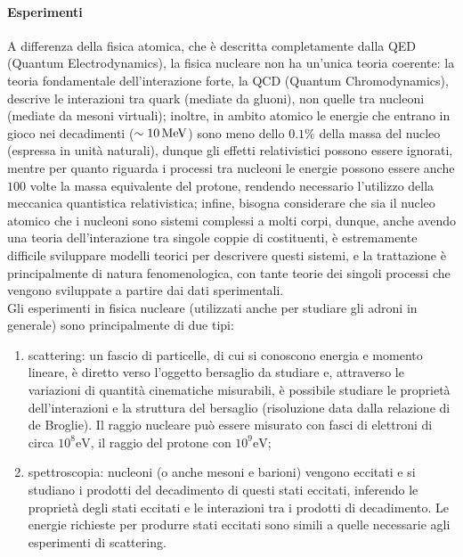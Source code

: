 \paragraph{Esperimenti}

A differenza della fisica atomica, che è descritta completamente dalla QED (Quantum Electrodynamics), la fisica nucleare non ha un'unica teoria coerente: la teoria fondamentale dell'interazione forte, la QCD (Quantum Chromodynamics), descrive le interazioni tra quark (mediate da gluoni), non quelle tra nucleoni (mediate da mesoni virtuali); inoltre, in ambito atomico le energie che entrano in gioco nei decadimenti ($ \sim 10\,\mathrm{MeV} $) sono meno dello $ 0.1\% $ della massa del nucleo (espressa in unità naturali), dunque gli effetti relativistici possono essere ignorati, mentre per quanto riguarda i processi tra nucleoni le energie possono essere anche $ 100 $ volte la massa equivalente del protone, rendendo necessario l'utilizzo della meccanica quantistica relativistica; infine, bisogna considerare che sia il nucleo atomico che i nucleoni sono sistemi complessi a molti corpi, dunque, anche avendo una teoria dell'interazione tra singole coppie di costituenti, è estremamente difficile sviluppare modelli teorici per descrivere questi sistemi, e la trattazione è principalmente di natura fenomenologica, con tante teorie dei singoli processi che vengono sviluppate a partire dai dati sperimentali.\\
Gli esperimenti in fisica nucleare (utilizzati anche per studiare gli adroni in generale) sono principalmente di due tipi:
\begin{enumerate}
  \item scattering: un fascio di particelle, di cui si conoscono energia e momento lineare, è diretto verso l'oggetto bersaglio da studiare e, attraverso le variazioni di quantità cinematiche misurabili, è possibile studiare le proprietà dell'interazioni e la struttura del bersaglio (risoluzione data dalla relazione di de Broglie). Il raggio nucleare può essere misurato con fasci di elettroni di circa $10^8 \text{eV}$, il raggio del protone con $10^9 \text{eV}$;
  \item spettroscopia: nucleoni (o anche mesoni e barioni) vengono eccitati e si studiano i prodotti del decadimento di questi stati eccitati, inferendo le proprietà degli stati eccitati e le interazioni tra i prodotti di decadimento. Le energie richieste per produrre stati eccitati sono simili a quelle necessarie agli esperimenti di scattering.
\end{enumerate}
